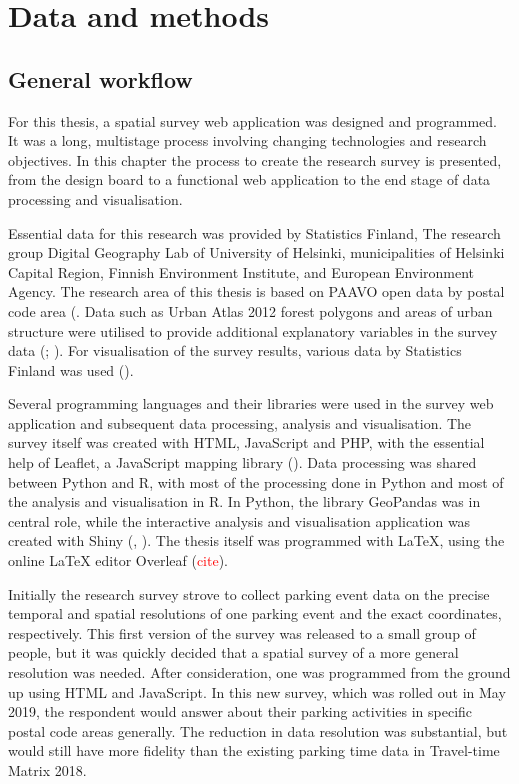 \section{Data and methods}
\subsection{General workflow}
\justify

For this thesis, a spatial survey web application was designed and programmed. It was a long, multistage process involving changing technologies and research objectives. In this chapter the process to create the research survey is presented, from the design board to a functional web application to the end stage of data processing and visualisation. 

Essential data for this research was provided by Statistics Finland, The research group Digital Geography Lab of University of Helsinki, municipalities of Helsinki Capital Region, Finnish Environment Institute, and European Environment Agency. The research area of this thesis is based on PAAVO open data by postal code area (\cite{StatisticsFinland2019a}. Data such as Urban Atlas 2012 forest polygons and areas of urban structure were utilised to provide additional explanatory variables in the survey data (\cite{EuropeanEnvironmentAgency2016}; \cite{Ristimaki2017}). For visualisation of the survey results, various data by Statistics Finland was used (\cite{StatisticsFinland2012}).

Several programming languages and their libraries were used in the survey web application and subsequent data processing, analysis and visualisation. The survey itself was created with HTML, JavaScript and PHP, with the essential help of Leaflet, a JavaScript mapping library (\cite{Agafonkin2019}). Data processing was shared between Python and R, with most of the processing done in Python and most of the analysis and visualisation in R. In Python, the library GeoPandas was in central role, while the interactive analysis and visualisation application was created with Shiny (\cite{GeoPandasDevelopers2019}, \cite{Chang2019}). The thesis itself was programmed with LaTeX, using the online LaTeX editor Overleaf (\textcolor{red}{cite}).

Initially the research survey strove to collect parking event data on the precise temporal and spatial resolutions of one parking event and the exact coordinates, respectively. This first version of the survey was released to a small group of people, but it was quickly decided that a spatial survey of a more general resolution was needed. After consideration, one was programmed from the ground up using HTML and JavaScript. In this new survey, which was rolled out in May 2019, the respondent would answer about their parking activities in specific postal code areas generally. The reduction in data resolution was substantial, but would still have more fidelity than the existing parking time data in Travel-time Matrix 2018.


